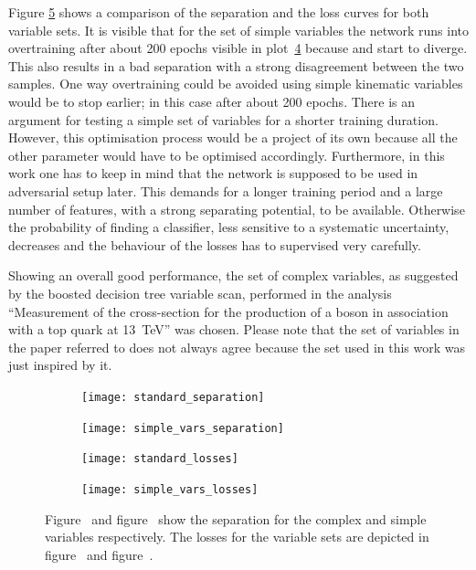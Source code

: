 %
Figure \ref{fig:vars} shows a comparison of the separation and the loss curves for both variable sets. It is visible that for the set of simple variables the network runs into overtraining after about \num{200} epochs visible in plot~\ref{fig:vars:simple:loss} because \losstrain and \losstest start to diverge. This also results in a bad separation with a strong disagreement between the two samples. One way overtraining could be avoided using simple kinematic variables would be to stop earlier; in this case after about 200 epochs. There is an argument for testing a simple set of variables for a shorter training duration. However, this optimisation process would be a project of its own because all the other parameter would have to be optimised accordingly. Furthermore, in this work one has to keep in mind that the network is supposed to be used in adversarial setup later. This demands for a longer training period and a large number of features, with a strong separating potential, to be available. Otherwise the probability of finding a classifier, less sensitive to a systematic uncertainty, decreases and the behaviour of the losses has to supervised very carefully.

Showing an overall good performance, the set of complex variables, as suggested by the boosted decision tree variable scan, performed in the analysis \enquote{Measurement of the cross-section for the production of a \PW boson in association with a top quark at \SI{13}{\tera \electronvolt}} was chosen\cite{Finelli:2667560}. Please note that the set of variables in the paper referred to does not always agree because the set used in this work was just inspired by it.

\begin{figure}[htbp]
    \centering
    \begin{subfigure}[b]{0.45\textwidth}
        \texttt{[image: standard\_separation]}
        \caption{}
        \label{fig:vars:standard:sep}
    \end{subfigure}
\quad
    \begin{subfigure}[b]{0.45\textwidth}
        \texttt{[image: simple\_vars\_separation]}
        \caption{}
        \label{fig:vars:simple:sep}
    \end{subfigure}

    \begin{subfigure}[b]{0.45\textwidth}
		\texttt{[image: standard\_losses]}
		\caption{}
		\label{fig:vars:standard:loss}
	\end{subfigure}
\quad
	\begin{subfigure}[b]{0.45\textwidth}
		\texttt{[image: simple\_vars\_losses]}
		\caption{}
		\label{fig:vars:simple:loss}
	\end{subfigure}
    \caption[Performance of the classifier using different variables]{Figure~ and figure~ show the separation for the complex and simple variables respectively. The losses for the variable sets are depicted in figure~ and figure~.}
	\label{fig:vars}
\end{figure}





